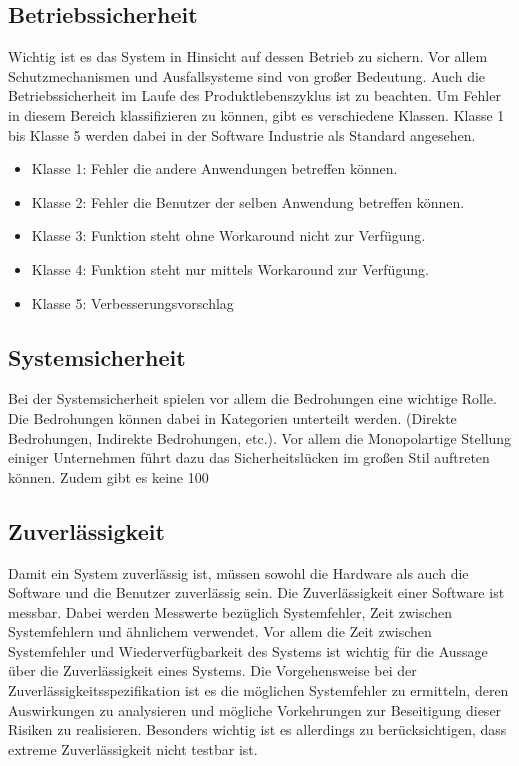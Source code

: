 \subsection{Betriebssicherheit}
Wichtig ist es das System in Hinsicht auf dessen Betrieb zu sichern. Vor allem Schutzmechanismen und Ausfallsysteme sind von großer Bedeutung. Auch die Betriebssicherheit im Laufe des Produktlebenszyklus ist zu beachten. Um Fehler in diesem Bereich klassifizieren zu können, gibt es verschiedene Klassen. Klasse 1 bis Klasse 5 werden dabei in der Software Industrie als Standard angesehen.

\begin{itemize}
\item Klasse 1: Fehler die andere Anwendungen betreffen können.
\item Klasse 2: Fehler die Benutzer der selben Anwendung betreffen können.
\item Klasse 3: Funktion steht ohne Workaround nicht zur Verfügung.
\item Klasse 4: Funktion steht nur mittels Workaround zur Verfügung.
\item Klasse 5: Verbesserungsvorschlag 
\end{itemize}

\subsection{Systemsicherheit}
Bei der Systemsicherheit spielen vor allem die Bedrohungen eine wichtige Rolle. Die Bedrohungen können dabei in Kategorien unterteilt werden. (Direkte Bedrohungen, Indirekte Bedrohungen, etc.). Vor allem die Monopolartige Stellung einiger Unternehmen führt dazu das Sicherheitslücken im großen Stil auftreten können. Zudem gibt es keine 100%

\subsection{Zuverlässigkeit}
Damit ein System zuverlässig ist, müssen sowohl die Hardware als auch die Software und die Benutzer zuverlässig sein. Die Zuverlässigkeit einer Software ist messbar. Dabei werden Messwerte bezüglich Systemfehler, Zeit zwischen Systemfehlern und ähnlichem verwendet. Vor allem die Zeit zwischen Systemfehler und Wiederverfügbarkeit des Systems ist wichtig für die Aussage über die Zuverlässigkeit eines Systems.
\linebreak
Die Vorgehensweise bei der Zuverlässigkeitsspezifikation  ist es die möglichen Systemfehler zu ermitteln, deren Auswirkungen zu analysieren und mögliche Vorkehrungen zur Beseitigung dieser Risiken zu realisieren. Besonders wichtig ist es allerdings zu berücksichtigen, dass extreme Zuverlässigkeit nicht testbar ist.

